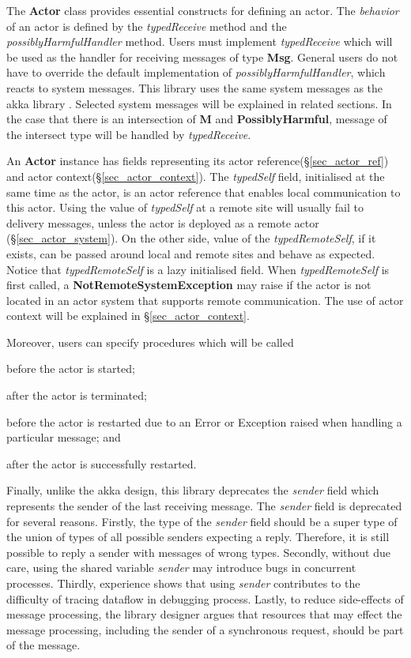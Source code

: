 The \textbf{Actor} class provides essential constructs for defining an actor.  The \textit{behavior} of an actor is defined by the \textit{typedReceive} method and the \textit{possiblyHarmfulHandler} method.  Users must implement \textit{typedReceive} which will be used as the handler for receiving messages of type \textbf{Msg}.  General users do not have to override the default implementation of \textit{possiblyHarmfulHandler}, which reacts to system messages.  This library uses the same system messages as the akka library \cite{akka_api}.  Selected system messages will be explained in related sections.  In the case that there is an intersection of \textbf{M} and \textbf{PossiblyHarmful}, message of the intersect type will be handled by \textit{typedReceive}.

An \textbf{Actor} instance has fields representing its actor reference(\S\ref{sec_actor_ref}) and actor context(\S\ref{sec_actor_context}).  The \textit{typedSelf} field, initialised at the same time as the actor, is an actor reference that enables local communication to this actor.  Using the value of \textit{typedSelf} at a remote site will usually fail to delivery messages, unless the actor is deployed as a remote actor (\S\ref{sec_actor_system}).  On the other side, value of the \textit{typedRemoteSelf}, if it exists, can be passed around local and remote sites and behave as expected.  Notice that \textit{typedRemoteSelf} is a lazy initialised field.  When \textit{typedRemoteSelf} is first called, a \textbf{NotRemoteSystemException} may raise if the actor is not located in an actor system that supports remote communication.  The use of actor context will be explained in \S\ref{sec_actor_context}.

Moreover, users can specify procedures which will be called 
\begin{inparaenum}[(i)]
\item before the actor is started;
\item after the actor is terminated;
\item before the actor is restarted due to an Error or Exception raised when handling a particular message; and
\item after the actor is successfully restarted.
\end{inparaenum}

Finally, unlike the akka design, this library deprecates the \textit{sender} field which represents the sender of the last receiving message.  The \textit{sender} field is deprecated for several reasons.  Firstly, the type of the \textit{sender} field should be a super type of the union of types of all possible senders expecting a reply.  Therefore, it is still possible to reply a sender with messages of wrong types.  Secondly, without due care, using the shared variable \textit{sender} may introduce bugs in concurrent processes.  Thirdly, experience shows that using \textit{sender} contributes to the difficulty of tracing dataflow in debugging process.  Lastly, to reduce side-effects of message processing, the library designer argues that resources that may effect the message processing, including the sender of a synchronous request, should be part of the message.

